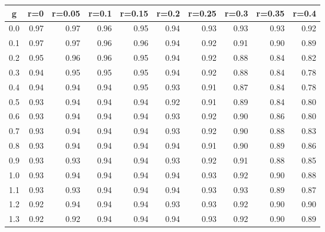 %
\begin{table}[!tbp]
 \begin{center}
 \begin{tabular}{rrrrrrrrrr}\hline\hline
\multicolumn{1}{c}{g}&\multicolumn{1}{c}{r=0}&\multicolumn{1}{c}{r=0.05}&\multicolumn{1}{c}{r=0.1}&\multicolumn{1}{c}{r=0.15}&\multicolumn{1}{c}{r=0.2}&\multicolumn{1}{c}{r=0.25}&\multicolumn{1}{c}{r=0.3}&\multicolumn{1}{c}{r=0.35}&\multicolumn{1}{c}{r=0.4}\tabularnewline
\hline
0.0&0.97&0.97&0.96&0.95&0.94&0.93&0.93&0.93&0.92\tabularnewline
0.1&0.97&0.97&0.96&0.96&0.94&0.92&0.91&0.90&0.89\tabularnewline
0.2&0.95&0.96&0.96&0.95&0.94&0.92&0.88&0.84&0.82\tabularnewline
0.3&0.94&0.95&0.95&0.95&0.94&0.92&0.88&0.84&0.78\tabularnewline
0.4&0.94&0.94&0.94&0.95&0.93&0.91&0.87&0.84&0.78\tabularnewline
0.5&0.93&0.94&0.94&0.94&0.92&0.91&0.89&0.84&0.80\tabularnewline
0.6&0.93&0.94&0.94&0.94&0.93&0.92&0.90&0.86&0.80\tabularnewline
0.7&0.93&0.94&0.94&0.94&0.93&0.92&0.90&0.88&0.83\tabularnewline
0.8&0.93&0.94&0.94&0.94&0.94&0.91&0.90&0.89&0.86\tabularnewline
0.9&0.93&0.93&0.94&0.94&0.93&0.92&0.91&0.88&0.85\tabularnewline
1.0&0.93&0.94&0.94&0.94&0.94&0.93&0.92&0.90&0.88\tabularnewline
1.1&0.93&0.93&0.94&0.94&0.94&0.93&0.93&0.89&0.87\tabularnewline
1.2&0.92&0.94&0.94&0.94&0.93&0.93&0.92&0.90&0.90\tabularnewline
1.3&0.92&0.92&0.94&0.94&0.94&0.93&0.92&0.90&0.89\tabularnewline
\hline
\end{tabular}

\end{center}

\end{table}

